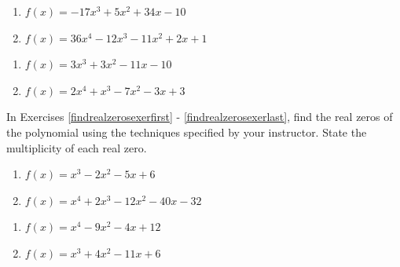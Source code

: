 \begin{multicols}{2}
\begin{enumerate}
\setcounter{enumi}{\value{HW}}

\item $f(x) = -17x^{3} + 5x^{2} + 34x - 10$
\item $f(x) = 36x^{4} - 12x^{3} - 11x^{2} + 2x + 1$

\setcounter{HW}{\value{enumi}}
\end{enumerate}
\end{multicols}

\begin{multicols}{2}
\begin{enumerate}
\setcounter{enumi}{\value{HW}}

\item $f(x) = 3x^{3} + 3x^{2} - 11x - 10$
\item $f(x) = 2x^4+x^3-7x^2-3x+3$ \label{prelimpolystufflast}


\setcounter{HW}{\value{enumi}}
\end{enumerate}
\end{multicols}


In Exercises \ref{findrealzerosexerfirst} - \ref{findrealzerosexerlast}, find the real zeros of the polynomial using the techniques specified by your instructor.  State the multiplicity of each real zero.

\begin{multicols}{2}
\begin{enumerate}
\setcounter{enumi}{\value{HW}}

\item $f(x) = x^{3} - 2x^{2} - 5x + 6$ \label{findrealzerosexerfirst}
\item $f(x) = x^{4} + 2x^{3} - 12x^{2} - 40x - 32$

\setcounter{HW}{\value{enumi}}
\end{enumerate}
\end{multicols}

\begin{multicols}{2}
\begin{enumerate}
\setcounter{enumi}{\value{HW}}

\item $f(x) = x^{4} - 9x^{2} - 4x + 12$
\item $f(x) = x^{3} + 4x^{2} - 11x + 6$

\setcounter{HW}{\value{enumi}}
\end{enumerate}
\end{multicols}

